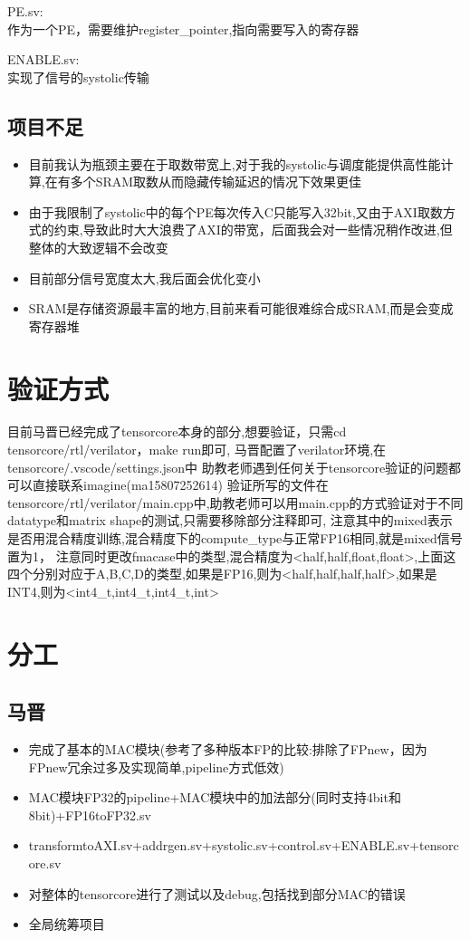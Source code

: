 \documentclass[zihao=-4, UTF8]{ctexart}
\begin{document}
PE.sv:\\
作为一个PE，需要维护register\_pointer,指向需要写入的寄存器

ENABLE.sv:\\
实现了信号的systolic传输

\subsection{项目不足}
\begin{itemize}
    \item 目前我认为瓶颈主要在于取数带宽上,对于我的systolic与调度能提供高性能计算,在有多个SRAM取数从而隐藏传输延迟的情况下效果更佳
    \item 由于我限制了systolic中的每个PE每次传入C只能写入32bit,又由于AXI取数方式的约束,导致此时大大浪费了AXI的带宽，后面我会对一些情况稍作改进,但整体的大致逻辑不会改变
    \item 目前部分信号宽度太大,我后面会优化变小
    \item SRAM是存储资源最丰富的地方,目前来看可能很难综合成SRAM,而是会变成寄存器堆
\end{itemize}

\section{验证方式}
目前马晋已经完成了tensorcore本身的部分,想要验证，只需cd tensorcore/rtl/verilator，make run即可,
马晋配置了verilator环境,在tensorcore/.vscode/settings.json中
助教老师遇到任何关于tensorcore验证的问题都可以直接联系imagine(ma15807252614)
验证所写的文件在tensorcore/rtl/verilator/main.cpp中,助教老师可以用main.cpp的方式验证对于不同datatype和matrix shape的测试,只需要移除部分注释即可,
注意其中的mixed表示是否用混合精度训练,混合精度下的compute\_type与正常FP16相同,就是mixed信号置为1，
注意同时更改fmacase中的类型,混合精度为<half,half,float,float>,上面这四个分别对应于A,B,C,D的类型,如果是FP16,则为<half,half,half,half>,如果是INT4,则为<int4\_t,int4\_t,int4\_t,int>

\section{分工}
\subsection{马晋}
\begin{itemize}
  \item 完成了基本的MAC模块(参考了多种版本FP的比较:排除了FPnew，因为FPnew冗余过多及实现简单,pipeline方式低效)
  \item MAC模块FP32的pipeline+MAC模块中的加法部分(同时支持4bit和8bit)+FP16toFP32.sv
  \item transformtoAXI.sv+addrgen.sv+systolic.sv+control.sv+ENABLE.sv+tensorcore.sv
  \item 对整体的tensorcore进行了测试以及debug,包括找到部分MAC的错误
  \item 全局统筹项目
\end{itemize}
\end{document}
